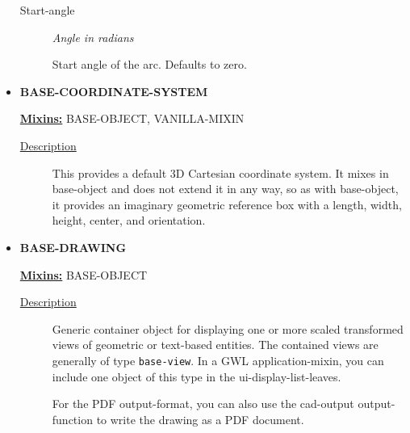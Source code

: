 \documentclass [11pt]{book}
\begin{document}
\begin{itemize}
\begin{description}
\item [Start-angle]
\emph{Angle in radians}

 Start angle of the arc. Defaults to zero.




\end{description}







\item {}
\label{prim:base-coordinate-system}
\textbf{BASE-COORDINATE-SYSTEM}


\textbf{
\underline{Mixins:}} BASE-OBJECT, VANILLA-MIXIN





\begin{description}

\item [
\underline{Description}]


This provides a default 3D Cartesian
   coordinate system. It mixes in base-object and does not extend it
   in any way, so as with base-object, it provides an imaginary
   geometric reference box with a length, width, height, center, and
   orientation.



\end{description}









\item {}
\label{prim:base-drawing}
\textbf{BASE-DRAWING}


\textbf{
\underline{Mixins:}} BASE-OBJECT





\begin{description}

\item [
\underline{Description}]


Generic container object for displaying one or more scaled
transformed views of geometric or text-based entities. The contained views are generally 
of type \texttt{base-view}. In a GWL application-mixin, you can include one 
object of this type in the ui-display-list-leaves.

For the PDF output-format, you can also use the cad-output output-function to write the 
drawing as a PDF document. 


\end{description}
\end{itemize}
\end{document}
